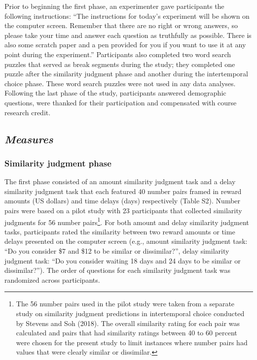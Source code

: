 \documentclass[
  pub,floatsintext]{apa6}
\begin{document}
Prior to beginning the first phase, an experimenter gave participants the following instructions: ``The instructions for today's experiment will be shown on the computer screen. Remember that there are no right or wrong answers, so please take your time and answer each question as truthfully as possible. There is also some scratch paper and a pen provided for you if you want to use it at any point during the experiment.'' Participants also completed two word search puzzles that served as break segments during the study; they completed one puzzle after the similarity judgment phase and another during the intertemporal choice phase. These word search puzzles were not used in any data analyses. Following the last phase of the study, participants answered demographic questions, were thanked for their participation and compensated with course research credit.

\hypertarget{measures}{%
\subsection{\texorpdfstring{\emph{Measures}}{Measures}}\label{measures}}

\hypertarget{similarity-judgment-phase}{%
\subsubsection{Similarity judgment phase}\label{similarity-judgment-phase}}

The first phase consisted of an amount similarity judgment task and a delay similarity judgment task that each featured 40 number pairs framed in reward amounts (US dollars) and time delays (days) respectively (Table S2). Number pairs were based on a pilot study with 23 participants that collected similarity judgments for 56 number pairs\footnote{The 56 number pairs used in the pilot study were taken from a separate study on similarity judgment predictions in intertemporal choice conducted by Stevens and Soh (2018). The overall similarity rating for each pair was calculated and pairs that had similarity ratings between 40 to 60 percent were chosen for the present study to limit instances where number pairs had values that were clearly similar or dissimilar.}. For both amount and delay similarity judgment tasks, participants rated the similarity between two reward amounts or time delays presented on the computer screen (e.g., amount similarity judgment task: ``Do you consider \$7 and \$12 to be similar or dissimilar?'', delay similarity judgment task: ``Do you consider waiting 18 days and 24 days to be similar or dissimilar?''). The order of questions for each similarity judgment task was randomized across participants.
\end{document}
